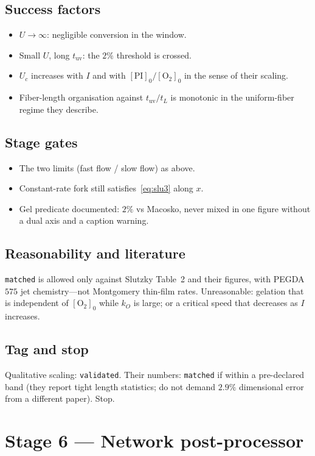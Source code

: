 \documentclass[11pt,a4paper]{article}
\newcommand{\tagvalid}{\texttt{validated}}
\newcommand{\tagmatch}{\texttt{matched}}
\begin{document}
\subsection{Success factors}
\begin{itemize}
  \item $U\to\infty$: negligible conversion in the window.
  \item Small $U$, long $t_{\mathrm{uv}}$: the $2\%$ threshold is crossed.
  \item $U_c$ increases with $I$ and with $[\mathrm{PI}]_0/[\mathrm{O}_2]_0$ in the sense of their scaling.
  \item Fiber-length organisation against $t_{\mathrm{uv}}/t_L$ is monotonic in the uniform-fiber regime they describe.
\end{itemize}

\subsection{Stage gates}
\begin{itemize}
  \item The two limits (fast flow / slow flow) as above.
  \item Constant-rate fork still satisfies~\eqref{eq:slu3} along $x$.
  \item Gel predicate documented: $2\%$ vs Macosko, never mixed in one figure without a dual axis and a caption warning.
\end{itemize}

\subsection{Reasonability and literature}
\tagmatch{} is allowed only against Slutzky Table~2 and their figures, with PEGDA~$575$ jet chemistry---not Montgomery thin-film rates.
Unreasonable: gelation that is independent of $[\mathrm{O}_2]_0$ while $k_O$ is large; or a critical speed that decreases as $I$ increases.

\subsection{Tag and stop}
Qualitative scaling: \tagvalid.
Their numbers: \tagmatch{} if within a pre-declared band (they report tight length statistics; do not demand $2.9\%$ dimensional error from a different paper).
Stop.

\section{Stage 6 --- Network post-processor}
\end{document}

